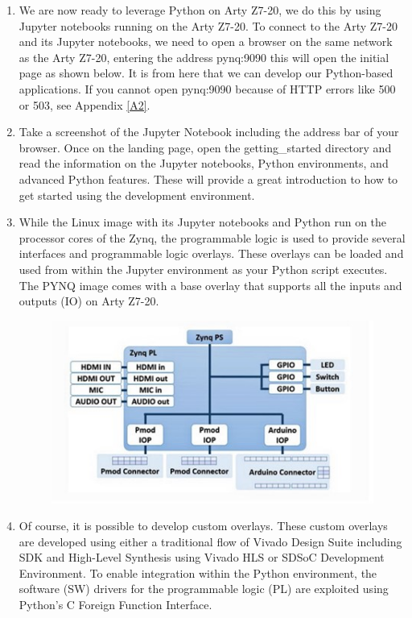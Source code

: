 \documentclass[a4paper,12pt,twoside]{article}
\begin{document}
\begin{enumerate}
\begin{figure}[H]
    \end{figure}
    \item We are now ready to leverage Python on Arty Z7-20, we do this by using Jupyter notebooks running on the Arty Z7-20. To connect to the Arty Z7-20 and its Jupyter notebooks, we need to open a browser on the same network as the Arty Z7-20, entering the address pynq:9090 this will open the initial page as shown below. It is from here that we can develop our Python-based applications. If you cannot open pynq:9090 because of HTTP errors like 500 or 503, see Appendix \ref{A2}.
    \item Take a screenshot of the Jupyter Notebook including the address bar of your browser. Once on the landing page, open the getting\_started directory and read the information on the Jupyter notebooks, Python environments, and advanced Python features. These will provide a great introduction to how to get started using the development environment.
    \item While the Linux image with its Jupyter notebooks and Python run on the processor cores of the Zynq, the programmable logic is used to provide several interfaces and programmable logic overlays. These overlays can be loaded and used from within the Jupyter environment as your Python script executes. The PYNQ image comes with a base overlay that supports all the inputs and outputs (IO) on Arty Z7-20.
    \begin{figure}[H]
        \centering
        \includegraphics[width=\textwidth]{images/9.jpg}
    \end{figure}
    \item Of course, it is possible to develop custom overlays. These custom overlays are developed using either a traditional flow of Vivado Design Suite including SDK and High-Level Synthesis using Vivado HLS or SDSoC Development Environment. To enable integration within the Python environment, the software (SW) drivers for the programmable logic (PL) are exploited using Python’s C Foreign Function Interface.
\end{enumerate}
\end{document}
